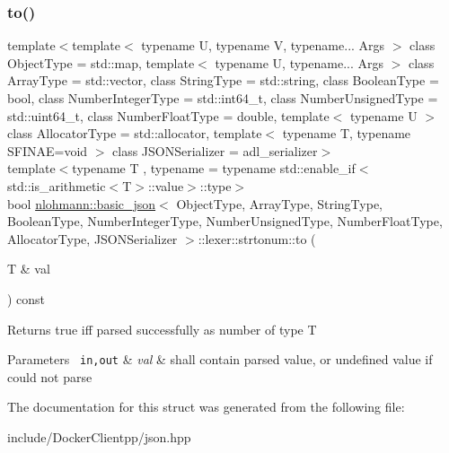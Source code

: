 \subsubsection{\texorpdfstring{to()}{to()}}
{\footnotesize\ttfamily template$<$template$<$ typename U, typename V, typename... Args $>$ class Object\+Type = std\+::map, template$<$ typename U, typename... Args $>$ class Array\+Type = std\+::vector, class String\+Type  = std\+::string, class Boolean\+Type  = bool, class Number\+Integer\+Type  = std\+::int64\+\_\+t, class Number\+Unsigned\+Type  = std\+::uint64\+\_\+t, class Number\+Float\+Type  = double, template$<$ typename U $>$ class Allocator\+Type = std\+::allocator, template$<$ typename T, typename S\+F\+I\+N\+A\+E=void $>$ class J\+S\+O\+N\+Serializer = adl\+\_\+serializer$>$ \\
template$<$typename T , typename  = typename std\+::enable\+\_\+if$<$std\+::is\+\_\+arithmetic$<$\+T$>$\+::value$>$\+::type$>$ \\
bool \mbox{\hyperlink{classnlohmann_1_1basic__json}{nlohmann\+::basic\+\_\+json}}$<$ Object\+Type, Array\+Type, String\+Type, Boolean\+Type, Number\+Integer\+Type, Number\+Unsigned\+Type, Number\+Float\+Type, Allocator\+Type, J\+S\+O\+N\+Serializer $>$\+::lexer\+::strtonum\+::to (\begin{DoxyParamCaption}\item[{T \&}]{val }\end{DoxyParamCaption}) const\hspace{0.3cm}{\ttfamily [inline]}}

\begin{DoxyReturn}{Returns}
true iff parsed successfully as number of type T
\end{DoxyReturn}

\begin{DoxyParams}[1]{Parameters}
\mbox{\texttt{ in,out}}  & {\em val} & shall contain parsed value, or undefined value if could not parse \\
\hline
\end{DoxyParams}


The documentation for this struct was generated from the following file\+:\begin{DoxyCompactItemize}
\item 
include/\+Docker\+Clientpp/json.\+hpp\end{DoxyCompactItemize}
